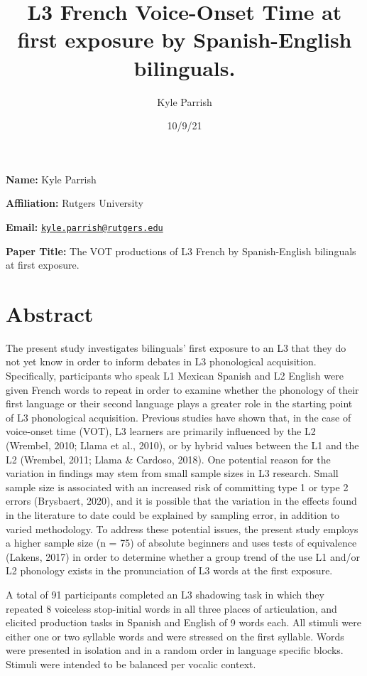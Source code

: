 \documentclass[
  12pt,
]{article}
\title{L3 French Voice-Onset Time at first exposure by Spanish-English
bilinguals.}
\author{Kyle Parrish}
\date{10/9/21}
\begin{document}
\maketitle

\textbf{Name:} Kyle Parrish

\textbf{Affiliation:} Rutgers University

\textbf{Email:}
\href{mailto:kyle.parrish@rutgers.edu}{\nolinkurl{kyle.parrish@rutgers.edu}}

\textbf{Paper Title:} The VOT productions of L3 French by
Spanish-English bilinguals at first exposure.

\newpage

\hypertarget{abstract}{%
\section{Abstract}\label{abstract}}

The present study investigates bilinguals' first exposure to an L3 that
they do not yet know in order to inform debates in L3 phonological
acquisition. Specifically, participants who speak L1 Mexican Spanish and
L2 English were given French words to repeat in order to examine whether
the phonology of their first language or their second language plays a
greater role in the starting point of L3 phonological acquisition.
Previous studies have shown that, in the case of voice-onset time (VOT),
L3 learners are primarily influenced by the L2 (Wrembel, 2010; Llama et
al., 2010), or by hybrid values between the L1 and the L2 (Wrembel,
2011; Llama \& Cardoso, 2018). One potential reason for the variation in
findings may stem from small sample sizes in L3 research. Small sample
size is associated with an increased risk of committing type 1 or type 2
errors (Brysbaert, 2020), and it is possible that the variation in the
effects found in the literature to date could be explained by sampling
error, in addition to varied methodology. To address these potential
issues, the present study employs a higher sample size (n = 75) of
absolute beginners and uses tests of equivalence (Lakens, 2017) in order
to determine whether a group trend of the use L1 and/or L2 phonology
exists in the pronunciation of L3 words at the first exposure.

A total of 91 participants completed an L3 shadowing task in which they
repeated 8 voiceless stop-initial words in all three places of
articulation, and elicited production tasks in Spanish and English of 9
words each. All stimuli were either one or two syllable words and were
stressed on the first syllable. Words were presented in isolation and in
a random order in language specific blocks. Stimuli were intended to be
balanced per vocalic context.
\end{document}
